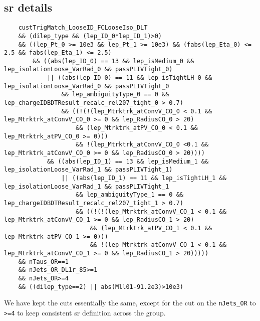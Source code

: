 \subsection[SR details]{\gls{sr} details}

{\scriptsize
    \begin{verbatim}
    custTrigMatch_LooseID_FCLooseIso_DLT
    && (dilep_type && (lep_ID_0*lep_ID_1)>0)
    && ((lep_Pt_0 >= 10e3 && lep_Pt_1 >= 10e3) && (fabs(lep_Eta_0) <= 2.5 && fabs(lep_Eta_1) <= 2.5)
        && ((abs(lep_ID_0) == 13 && lep_isMedium_0 && lep_isolationLoose_VarRad_0 && passPLIVTight_0)
            || ((abs(lep_ID_0) == 11 && lep_isTightLH_0 && lep_isolationLoose_VarRad_0 && passPLIVTight_0
                && lep_ambiguityType_0 == 0 && lep_chargeIDBDTResult_recalc_rel207_tight_0 > 0.7)
                && ((!(!(lep_Mtrktrk_atConvV_CO_0 < 0.1 && lep_Mtrktrk_atConvV_CO_0 >= 0 && lep_RadiusCO_0 > 20)
                    && (lep_Mtrktrk_atPV_CO_0 < 0.1 && lep_Mtrktrk_atPV_CO_0 >= 0)))
                    && !(lep_Mtrktrk_atConvV_CO_0 <0.1 && lep_Mtrktrk_atConvV_CO_0 >= 0 && lep_RadiusCO_0 > 20))))
            && ((abs(lep_ID_1) == 13 && lep_isMedium_1 && lep_isolationLoose_VarRad_1 && passPLIVTight_1)
                || ((abs(lep_ID_1) == 11 && lep_isTightLH_1 && lep_isolationLoose_VarRad_1 && passPLIVTight_1
                    && lep_ambiguityType_1 == 0 && lep_chargeIDBDTResult_recalc_rel207_tight_1 > 0.7)
                    && ((!(!(lep_Mtrktrk_atConvV_CO_1 < 0.1 && lep_Mtrktrk_atConvV_CO_1 >= 0 && lep_RadiusCO_1 > 20)
                        && (lep_Mtrktrk_atPV_CO_1 < 0.1 && lep_Mtrktrk_atPV_CO_1 >= 0)))
                        && !(lep_Mtrktrk_atConvV_CO_1 < 0.1 && lep_Mtrktrk_atConvV_CO_1 >= 0 && lep_RadiusCO_1 > 20)))))
    && nTaus_OR==1
    && nJets_OR_DL1r_85>=1
    && nJets_OR>=4
    && ((dilep_type==2) || abs(Mll01-91.2e3)>10e3)
\end{verbatim}
}

We have kept the cuts essentially the same, except for the cut on the \verb|nJets_OR| to \verb|>=4| to keep consistent
\gls{sr} definition across the group.
